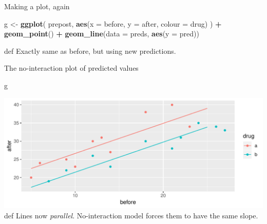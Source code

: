 \documentclass[ignorenonframetext,]{beamer}
\newenvironment{Shaded}{\begin{snugshade}}{\end{snugshade}}
\newcommand{\DataTypeTok}[1]{\textcolor[rgb]{0.13,0.29,0.53}{#1}}
\newcommand{\KeywordTok}[1]{\textcolor[rgb]{0.13,0.29,0.53}{\textbf{#1}}}
\newcommand{\NormalTok}[1]{#1}
\newcommand{\OperatorTok}[1]{\textcolor[rgb]{0.81,0.36,0.00}{\textbf{#1}}}
\newcommand{\StringTok}[1]{\textcolor[rgb]{0.31,0.60,0.02}{#1}}
\begin{document}
\begin{frame}[fragile]{Making a plot, again}
\protect\hypertarget{making-a-plot-again}{}

\begin{Shaded}
\begin{Highlighting}[]
\NormalTok{g <-}\StringTok{ }\KeywordTok{ggplot}\NormalTok{(}
\NormalTok{  prepost,}
  \KeywordTok{aes}\NormalTok{(}\DataTypeTok{x =}\NormalTok{ before, }\DataTypeTok{y =}\NormalTok{ after, }\DataTypeTok{colour =}\NormalTok{ drug)}
\NormalTok{) }\OperatorTok{+}
\StringTok{  }\KeywordTok{geom_point}\NormalTok{() }\OperatorTok{+}
\StringTok{  }\KeywordTok{geom_line}\NormalTok{(}\DataTypeTok{data =}\NormalTok{ preds, }\KeywordTok{aes}\NormalTok{(}\DataTypeTok{y =}\NormalTok{ pred))}
\end{Highlighting}
\end{Shaded}

def Exactly same as before, but using new predictions.

\end{frame}

\begin{frame}[fragile]{The no-interaction plot of predicted values}
\protect\hypertarget{the-no-interaction-plot-of-predicted-values}{}

\begin{Shaded}
\begin{Highlighting}[]
\NormalTok{g}
\end{Highlighting}
\end{Shaded}

\includegraphics{figure/cabazzo-1.pdf} def Lines now \emph{parallel}.
No-interaction model forces them to have the same slope.

\end{frame}
\end{document}
